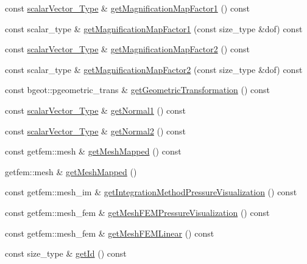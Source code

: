 \begin{DoxyCompactItemize}
\item 
const \hyperlink{Core_8h_a4e75b5863535ba1dd79942de2846eff0}{scalar\-Vector\-\_\-\-Type} \& \hyperlink{classFractureHandler_abaf5f99ba68775a587d6b3f0222e8b9a}{get\-Magnification\-Map\-Factor1} () const 
\item 
const scalar\-\_\-type \& \hyperlink{classFractureHandler_a1cafea5a92ab3a9b5eae67c347867f58}{get\-Magnification\-Map\-Factor1} (const size\-\_\-type \&dof) const 
\item 
const \hyperlink{Core_8h_a4e75b5863535ba1dd79942de2846eff0}{scalar\-Vector\-\_\-\-Type} \& \hyperlink{classFractureHandler_a68b09b4012669140979a0026736b3dfe}{get\-Magnification\-Map\-Factor2} () const 
\item 
const scalar\-\_\-type \& \hyperlink{classFractureHandler_a5bbe076a3595909f6af49e8d69e39231}{get\-Magnification\-Map\-Factor2} (const size\-\_\-type \&dof) const 
\item 
const bgeot\-::pgeometric\-\_\-trans \& \hyperlink{classFractureHandler_a2e1d27efecfa84246375be5f4262bab2}{get\-Geometric\-Transformation} () const 
\item 
const \hyperlink{Core_8h_a4e75b5863535ba1dd79942de2846eff0}{scalar\-Vector\-\_\-\-Type} \& \hyperlink{classFractureHandler_a22e229a4016119138c48b456a185e1ff}{get\-Normal1} () const 
\item 
const \hyperlink{Core_8h_a4e75b5863535ba1dd79942de2846eff0}{scalar\-Vector\-\_\-\-Type} \& \hyperlink{classFractureHandler_ae707e764eaff191e2856765131289c82}{get\-Normal2} () const 
\item 
const getfem\-::mesh \& \hyperlink{classFractureHandler_a79b2fbb306b2bc045d5bef0b73d12ec8}{get\-Mesh\-Mapped} () const 
\item 
getfem\-::mesh \& \hyperlink{classFractureHandler_ad3fa0255b0e57f6562dc98bbf71588b1}{get\-Mesh\-Mapped} ()
\item 
const getfem\-::mesh\-\_\-im \& \hyperlink{classFractureHandler_a157f39f66131faf579b980b6b5fb91fb}{get\-Integration\-Method\-Pressure\-Visualization} () const 
\item 
const getfem\-::mesh\-\_\-fem \& \hyperlink{classFractureHandler_ac78f500422e542b77114e56f11173b0d}{get\-Mesh\-F\-E\-M\-Pressure\-Visualization} () const 
\item 
const getfem\-::mesh\-\_\-fem \& \hyperlink{classFractureHandler_ab77ee6aaf47d7f1d80fd1ff23bd34a33}{get\-Mesh\-F\-E\-M\-Linear} () const 
\item 
const size\-\_\-type \& \hyperlink{classFractureHandler_a7f7ec5b15315791f76d8deb0874511d6}{get\-Id} () const 

\end{DoxyCompactItemize}
